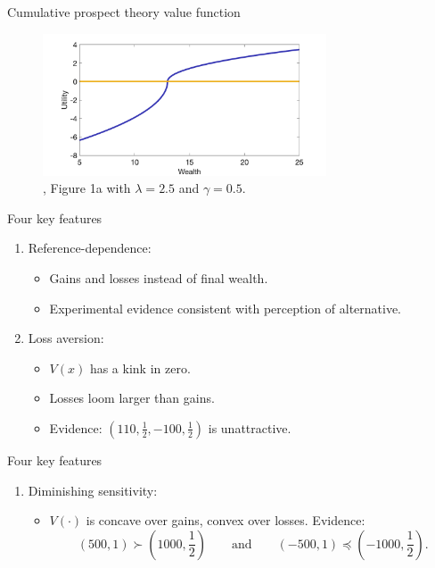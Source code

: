 \documentclass[11pt, aspectratio=169]{beamer}
\begin{document}
\begin{frame}{Cumulative prospect theory value function}
    \begin{figure}
\centering
\includegraphics[width= 0.75\textwidth]{cpt_utility}
\caption{\citet{Barberis2012a}, Figure 1a with $\lambda = 2.5$ and $\gamma =0.5$.}
    \end{figure}
\end{frame}


\begin{frame}{Four key features}
    \begin{enumerate}[1.]
        \item Reference-dependence:\medskip
            \begin{itemize}
                \item Gains and losses instead of final wealth.\medskip
                \item Experimental evidence consistent with perception of alternative.\medskip
            \end{itemize}\bigskip
        \item Loss aversion:\medskip
            \begin{itemize}
                \item $V(x)$ has a kink in zero.\medskip
                \item Losses loom larger than gains.\medskip
                \item Evidence: $(110,\frac{1}{2},-100,\frac{1}{2})$ is unattractive.
            \end{itemize}
    \end{enumerate}
\end{frame}

\begin{frame}{Four key features}
    \begin{enumerate}[3.]
        \item Diminishing sensitivity:\medskip
            \begin{itemize}
                \item $V(\cdot)$ is concave over gains, convex over losses. Evidence:
               \[(500,1) \succ \left(1000,\frac{1}{2}\right) \qquad \text{and}
                \qquad (-500,1) \preceq  \left(-1000,\frac{1}{2}\right).\]
            \end{itemize}
    \end{enumerate}
\end{frame}
\end{document}

